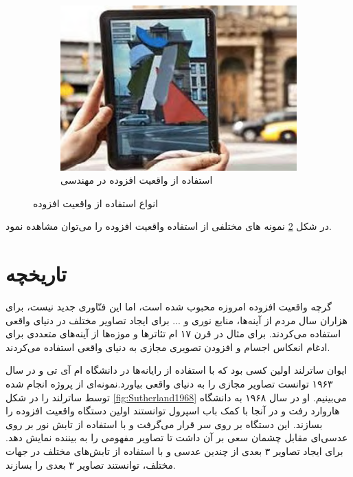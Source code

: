 \begin{figure}
		\begin{subfigure}[b]{0.4\textwidth}
			\includegraphics[width=\textwidth]{image/AR_architecture_by_Re+Public}
			\caption{استفاده از واقعیت افزوده در مهندسی
			\\
			\cite{Fjeld}}
			\label{fig:mouse}
		\end{subfigure}
		\caption{انواع استفاده از واقعیت افزوده}\label{fig:َARType}
	\end{figure}
در شکل \ref{fig:َARType} نمونه های مختلفی از استفاده واقعیت افزوده را می‌توان مشاهده نمود.
\section{تاریخچه}
گرچه واقعیت افزوده امروزه محبوب شده است، اما این فنّاوری جدید نیست، برای هزاران سال مردم از آینه‌ها، منابع نوری و ... برای ایجاد تصاویر مختلف در دنیای واقعی استفاده می‌کردند. برای مثال در قرن ۱۷ ام تئاترها و موزه‌ها از آینه‌های متعددی  برای ادغام انعکاس اجسام و افزودن تصویری مجازی به دنیای واقعی استفاده می‌کردند\cite{Brooker}.

ایوان ساترلند   اولین کسی بود که با استفاده از رایانه‌ها در دانشگاه ام آی تی  و در سال ۱۹۶۳ توانست تصاویر مجازی را به دنیای واقعی بیاورد\cite{Sutherland}.نمونه‌ای از پروژه انجام شده توسط ساترلند را در شکل \ref{fig:Sutherland1968} می‌بینیم. او در سال ۱۹۶۸ به دانشگاه هاروارد  رفت و در آنجا با کمک باب اسپرول  توانستند اولین دستگاه واقعیت افزوده را بسازند\cite{Sutherland2}. این دستگاه بر روی سر قرار می‌گرفت و با استفاده از تابش نور بر روی عدسی‌ای مقابل چشمان سعی بر آن داشت تا تصاویر مفهومی را به بیننده نمایش دهد. برای ایجاد تصاویر ۳ بعدی از چندین عدسی و با استفاده از تابش‌های مختلف در جهات مختلف، توانستند تصاویر ۳ بعدی را بسازند\cite{Sutherland2}.

